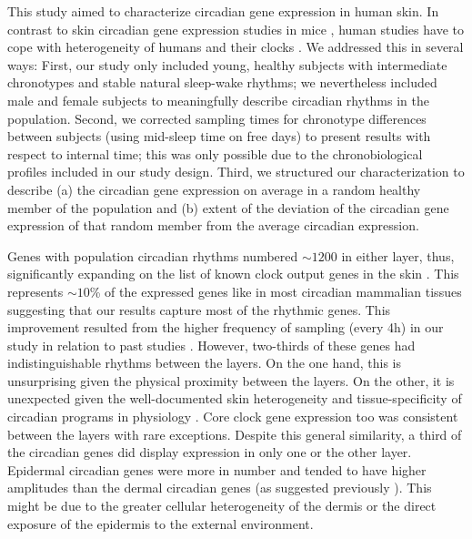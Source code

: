 \normalsize

This study aimed to characterize circadian gene expression in human skin. In contrast to skin circadian gene expression studies in mice \cite{Geyfman2012}, human studies have to cope with heterogeneity of humans and their clocks \cite{Roenneberg2007}. We addressed this in several ways: First, our study only included young, healthy subjects with intermediate chronotypes and stable natural sleep-wake rhythms; we nevertheless included male and female subjects to meaningfully describe circadian rhythms in the population. Second, we corrected sampling times for chronotype differences between subjects (using mid-sleep time on free days) to present results with respect to internal time; this was only possible due to the chronobiological profiles included in our study design. Third, we structured our characterization to describe (a) the circadian gene expression on average in a random healthy member of the population and  (b) extent of the deviation of the circadian gene expression of that random member from the average circadian expression.

Genes with population circadian rhythms numbered $\sim 1200$ in either layer, thus, significantly expanding on the list of known clock output genes in the skin \cite{Wu2018,Wu2020}. This represents $\sim 10$\% of the expressed genes like in most circadian mammalian tissues \cite{Zhang2014,Ruben2018} suggesting that our results capture most of the rhythmic genes. This improvement resulted from the higher frequency of sampling (every 4h) in our study in relation to past studies \cite{Spoerl2012,Wu2018,Wu2020}. However, two-thirds of these genes had indistinguishable rhythms between the layers. On the one hand, this is unsurprising given the physical proximity between the layers. On the other, it is unexpected given the well-documented skin heterogeneity \cite{Duan2021} and tissue-specificity of circadian programs in physiology \cite{Ruben2018}. Core clock gene expression too was consistent between the layers with rare exceptions. Despite this general similarity, a third of the circadian genes did display expression in only one or the other layer. Epidermal circadian genes were more in number and tended to have higher amplitudes than the dermal circadian genes (as suggested previously \cite{Wu2020}). This might be due to the greater cellular heterogeneity of the dermis or the direct exposure of the epidermis to the external environment.

